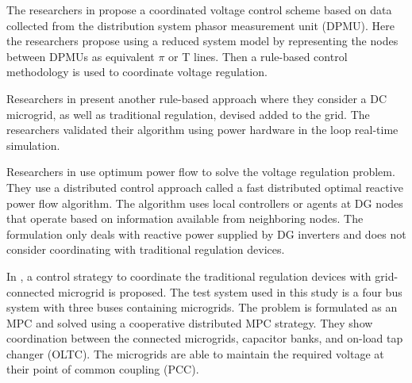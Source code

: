 \documentclass[Journal]{IEEEtran}
\begin{document}
The researchers in \cite{NLR_3} propose a coordinated voltage control scheme based on data collected from the distribution system phasor measurement unit (DPMU). Here the researchers propose using a reduced system model by representing the nodes between DPMUs as equivalent $\pi$ or T  lines. Then a rule-based control methodology is used to coordinate voltage regulation.  

Researchers in \cite{NLR_4} present another rule-based approach where they consider a DC microgrid, as well as traditional regulation, devised added to the grid. The researchers validated their algorithm using power hardware in the loop real-time simulation. 


Researchers in \cite{NLR_6} use optimum power flow to solve the voltage regulation problem. They use a distributed control approach called a fast distributed optimal reactive power flow algorithm. The algorithm uses local controllers or agents at DG nodes that operate based on information available from neighboring nodes. The formulation only deals with reactive power supplied by DG inverters and does not consider coordinating with traditional regulation devices. 

In \cite{NLR_7}, a control strategy to coordinate the traditional regulation devices with grid-connected microgrid is proposed. The test system used in this study is a four bus system with three buses containing microgrids. The problem is formulated as an MPC and solved using a cooperative distributed MPC strategy. They show coordination between the connected microgrids, capacitor banks, and on-load tap changer (OLTC). The microgrids are able to maintain the required voltage at their point of common coupling (PCC).
\end{document}
